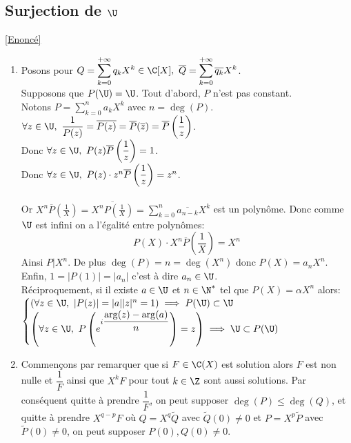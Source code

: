 \documentclass{book}
\begin{document}
	\subsection{Surjection de $\U$}
	\label{Surjection de U corrigé}
	\textcolor{blue}{\hyperref[Surjection de U]{[Enoncé]}}\\
	\begin{enumerate}[leftmargin=*]
		\item Posons pour $Q=\displaystyle\sum\limits_{k=0}^{+\infty}q_kX^k\in \C[X],\ \overline{Q}=\displaystyle\sum\limits_{k=0}^{+\infty}\overline{q_k}X^k$.\\
		Supposons que $P(\U)=\U$. Tout d'abord, $P$ n'est pas constant.\\
		Notons $P=\displaystyle\sum\limits_{k=0}^n{a_kX^k}$ avec $n=\deg(P)$.\\
		$\forall z\in \U,\ \displaystyle\frac{1}{P(z)}=\overline{P(z)}=\overline{P}(\overline{z})=\overline{P}\left(\displaystyle\frac{1}{z}\right)$.\\
		Donc $\forall z\in \U,\ P(z)\overline{P}\left(\displaystyle\frac{1}{z}\right)=1$.\\
		Donc $\forall z\in \U,\ P(z)\cdot z^n\overline{P}\left(\displaystyle\frac{1}{z}\right)=z^n$.\\\\
		Or $X^n\overline{P}\left(\displaystyle\frac{1}{X}\right)=\overline{X^nP\left(\displaystyle\frac{1}{X}\right)}=\displaystyle\sum\limits_{k=0}^n{\overline{a_{n-k}}X^k}$ est un polynôme. Donc comme $\U$ est infini on a l'égalité entre polynômes:
		$$P(X)\cdot X^n\overline{P}\left(\displaystyle\frac{1}{X}\right)=X^n$$
		Ainsi $P|X^n$. De plus $\deg(P)=n=\deg(X^n)$ donc $P(X)=a_nX^n$. Enfin, $1=|P(1)|=|a_n|$ c'est à dire $a_n\in \U$.\\
		Réciproquement, si il existe $a\in \U$ et $n\in \N^*$ tel que $P(X)=\alpha X^n$ alors:\\
		$\begin{cases}
			(\forall z\in \U,\ |P(z)|=|a||z|^n=1)\implies P(\U)\subset \U\\
			\left(\forall z\in \U,\ P\left(e^{i\dfrac{\arg(z)-\arg(a)}{n}}\right)=z\right)\implies \U\subset P(\U)
		\end{cases}$
		\item Commençons par remarquer que si $F\in \C(X)$ est solution alors $F$ est non nulle et $\dfrac{1}{F}$ ainsi que $X^kF$ pour tout $k\in \Z$ sont aussi solutions. Par conséquent quitte à prendre $\dfrac{1}{F}$, on peut supposer $\deg(P)\leq \deg(Q)$, et quitte à prendre $X^{q-p}F$ où $Q=X^q\tilde Q$ avec $\tilde Q(0)\ne 0$ et $P=X^p\tilde P$ avec $\tilde P(0)\ne 0$, on peut supposer $P(0),Q(0)\ne 0$.\\

\end{enumerate}
\end{document}
